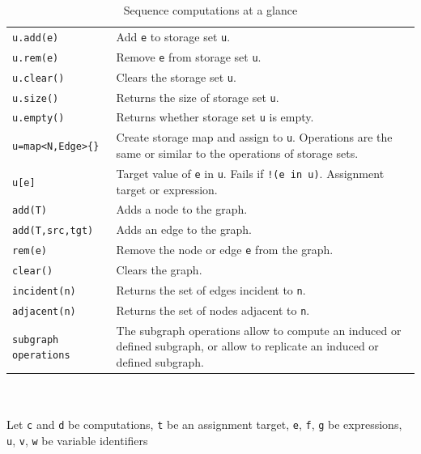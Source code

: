\begin{table}[htbp]
\begin{minipage}{\linewidth}
\begin{tabularx}{\linewidth}{|lX|}
\texttt{u.add(e)}	& Add \texttt{e} to storage set \texttt{u}.\\
\texttt{u.rem(e)}	& Remove \texttt{e} from storage set \texttt{u}.\\
\texttt{u.clear()}	& Clears the storage set \texttt{u}.\\
\texttt{u.size()}	& Returns the size of storage set \texttt{u}.\\
\texttt{u.empty()} & Returns whether storage set \texttt{u} is empty.\\
\texttt{u=map<N,Edge>\{\}}	& Create storage map and assign to \texttt{u}. Operations are the same or similar to the operations of storage sets.\\
\texttt{u[e]}	& Target value of \texttt{e} in \texttt{u}. Fails if \texttt{!(e in u)}. Assignment target or expression.\\
\hline
\texttt{add(T)}	& Adds a node to the graph.\\
\texttt{add(T,src,tgt)}	& Adds an edge to the graph.\\
\texttt{rem(e)}	& Remove the node or edge \texttt{e} from the graph.\\
\texttt{clear()}	& Clears the graph.\\
\texttt{incident(n)}	& Returns the set of edges incident to \texttt{n}.\\
\texttt{adjacent(n)} & Returns the set of nodes adjacent to \texttt{n}.\\
\texttt{subgraph operations} & The subgraph operations allow to compute an induced or defined subgraph, or allow to replicate an induced or defined subgraph.\\
\hline
\end{tabularx}
\end{minipage}\\
\\ 
{\small Let \texttt{c} and \texttt{d} be computations, \texttt{t} be an assignment target, \texttt{e}, \texttt{f}, \texttt{g} be expressions, \texttt{u}, \texttt{v}, \texttt{w} be variable identifiers }
\caption{Sequence computations at a glance}
\label{comptab}
\end{table}
 

